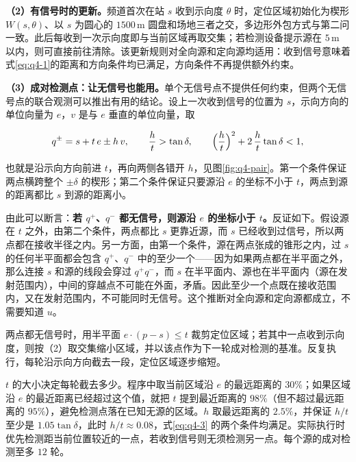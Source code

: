 \textbf{（2）有信号时的更新。}频道首次在站 $s$ 收到示向度 $\theta$ 时，定位区域初始化为楔形 $W(s,\theta)$、以 $s$ 为圆心的 $1500\,\mathrm{m}$ 圆盘和场地三者之交，多边形外包方式与第二问一致。此后每收到一次示向度即与当前区域再取交集；若检测设备提示源在 $5\,\mathrm{m}$ 以内，则可直接前往清除。该更新规则对全向源和定向源均适用：收到信号意味着式\eqref{eq:q4-1}的距离和方向条件均已满足，方向条件不再提供额外约束。

\textbf{（3）成对检测点：让无信号也能用。}单个无信号点不提供任何约束，但两个无信号点的联合观测可以推出有用的结论。设上一次收到信号的位置为 $s$，示向方向的单位向量为 $e$，$v$ 是与 $e$ 垂直的单位向量，取

\begin{equation}\label{eq:q4-3}
q^{\pm}=s+t\,e\pm h\,v,\qquad
\frac ht>\tan\delta,\qquad
\Bigl(\frac ht\Bigr)^2+2\,\frac ht\tan\delta<1 ,
\end{equation}

也就是沿示向方向前进 $t$，再向两侧各错开 $h$，见图\ref{fig:q4-pair}。第一个条件保证两点横跨整个 $\pm\delta$ 的楔形；第二个条件保证只要源沿 $e$ 的坐标不小于 $t$，两点到源的距离都比 $s$ 到源的距离小。

由此可以断言：\textbf{若 $q^+$、$q^-$ 都无信号，则源沿 $e$ 的坐标小于 $t$。}反证如下。假设源在 $t$ 之外，由第二个条件，两点都比 $s$ 更靠近源，而 $s$ 已经收到过信号，所以两点都在接收半径之内。另一方面，由第一个条件，源在两点张成的锥形之内，过 $s$ 的任何半平面都会包含 $q^+$、$q^-$ 中的至少一个——因为如果两点都在半平面之外，那么连接 $s$ 和源的线段会穿过 $q^+q^-$，而 $s$ 在半平面内、源也在半平面内（源在发射范围内），中间的穿越点不可能在外面，矛盾。因此至少一个点既在接收范围内，又在发射范围内，不可能同时无信号。这个推断对全向源和定向源都成立，不需要知道 $u$。

两点都无信号时，用半平面 $e\cdot(p-s)\le t$ 裁剪定位区域；若其中一点收到示向度，则按（2）取交集缩小区域，并以该点作为下一轮成对检测的基准。反复执行，每轮沿示向方向截去一段，定位区域逐步缩短。

$t$ 的大小决定每轮截去多少。程序中取当前区域沿 $e$ 的最远距离的 $30\%$；如果区域沿 $e$ 的最近距离已经超过这个值，就把 $t$ 提到最近距离的 $98\%$（但不超过最远距离的 $95\%$），避免检测点落在已知无源的区域。$h$ 取最远距离的 $2.5\%$，并保证 $h/t$ 至少是 $1.05\tan\delta$，此时 $h/t\approx0.08$，式\eqref{eq:q4-3} 的两个条件均满足。实际执行时优先检测距当前位置较近的一点，若收到信号则无须检测另一点。每个源的成对检测至多 $12$ 轮。

\begin{center}
\begin{minipage}{\linewidth}
\centering
\QFourPairFigure
{}
\label{fig:q4-pair}
\end{minipage}
\end{center}

